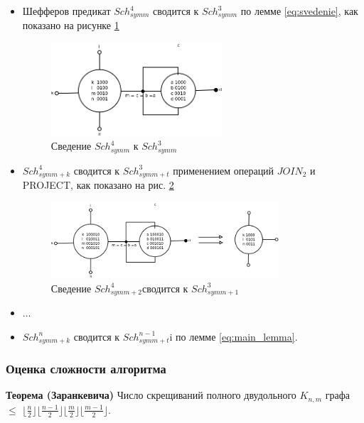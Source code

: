 \documentclass[12pt]{article}
\begin{document}
\begin{itemize}
\item Шефферов предикат $Sch_{symm}^4$ сводится к $Sch_{symm}^3$ по лемме 
\ref{eq:svedenie}, как показано на рисунке \ref{fig:4to3}
\begin{figure}[htb]
\centering
\includegraphics[width=0.6\textwidth]{4to3.png}
\caption{Сведение $Sch_{symm}^4$ к $Sch_{symm}^3$ }
\label{fig:4to3}
\end{figure}


\item $Sch_{symm+k}^4$ сводится к $Sch_{symm+t}^3$ применением операций $JOIN_2$ и PROJECT, как показано на рис.
\ref{fig:4_2to3_1}
\begin{figure}[htb]
\centering
\includegraphics[width=0.8\textwidth]{4_2to3_1.png}
\caption{Сведение $Sch_{symm+2}^4$сводится к $Sch_{symm+1}^3$}
\label{fig:4_2to3_1}
\end{figure}
\item $\ldots$
\item $Sch_{symm+k}^n$ сводится к $Sch_{symm+t}^{n-1}$i по лемме \ref{eq:main_lemma}.

\end{itemize}

\subsubsection{Оценка сложности алгоритма}

\label{ZarankTheorem}
\textbf{Теорема (Заранкевича)} Число скрещиваний полного двудольного $K_{n,m}$ графа $\leq$
$\lfloor \frac{n}{2} \rfloor \lfloor \frac{n-1}{2} \rfloor \lfloor \frac{m}{2} \rfloor \lfloor \frac{m-1}{2} \rfloor$.
\cite{Zarank54}
\end{document}
